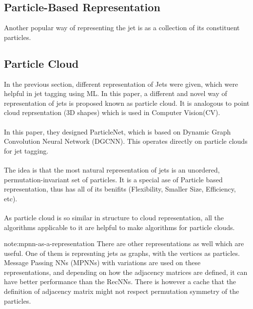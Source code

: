 \subsection{Particle-Based Representation}
Another popular way of representing the jet is as a collection of its constituent particles. 

\subsection{Particle Cloud}
In the previous section, different representation of Jets were given, which were helpful in jet tagging using ML. In this paper, a different and novel way of representation of jets is proposed known as particle cloud. It is analogous to point cloud reprsentation (3D shapes) which is used in Computer Vision(CV).

\paragraph{} In this paper, they designed ParticleNet, which is based on Dynamic Graph Convolution Neural Network (DGCNN). This operates directly on particle clouds for jet tagging.

\paragraph{} The idea is that the most natural representation of jets is an unordered, permutation-invariant set of particles. It is a special ase of Particle based representation, thus has all of its benifits (Flexibility, Smaller Size, Efficiency, etc).

\paragraph{} As particle cloud is so similar in structure to cloud representation, all the algorithms applicable to it are helpful to make algorithms for particle clouds.

\begin{note}{note:mpnn-as-a-representation}
    There are other representations as well which are useful. One of them is 
    represnting jets as graphs, with the vertices as particles. Message Passing 
    NNs (MPNNs) with variations are used on these representations, and depending 
    on how the adjacency matrices are defined, it can have better performance 
    than the RecNNs. There is however a cache that the definition of adjacency 
    matrix might not respect permutation symmetry of the particles.
\end{note}


